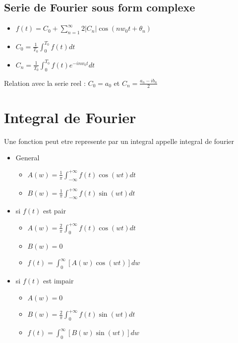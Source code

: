 \documentclass[12pt]{book}
\begin{document}
            \subsection{Serie de Fourier sous form complexe}
                \begin{itemize}
                    \item $f(t) = C_0 + \sum^\infty_{n=1} 2|C_n| \cos(nw_0t + \theta_n)$
                    \item $C_0 = \frac{1}{T_0}\int_0^{T_0}f(t)dt$
                    \item $C_n = \frac{1}{T_0}\int_0^{T_0}f(t)e^{-inw_0t}dt$
                \end{itemize}
                Relation avec la serie reel : $C_0 = a_0$ et $C_n=\frac{a_n-ib_n}{2}$
        \section{Integral de Fourier}
            Une fonction peut etre represente par un integral appelle integral de fourier \\  
            \begin{itemize}
                \item General 
                    \begin{itemize}
                        \item $A(w) = \frac{1}{\pi}\int^{+\infty}_{-\infty}f(t)\cos(wt)dt$
                        \item $B(w) = \frac{1}{\pi}\int^{+\infty}_{-\infty}f(t)\sin(wt)dt$
                    \end{itemize}
                \item si $f(t)$ est pair   
                    \begin{itemize}
                        \item $A(w) = \frac{2}{\pi}\int^{+\infty}_{0}f(t)\cos(wt)dt$
                        \item $B(w) = 0$
                        \item $f(t) = \int^\infty_0 [A(w)\cos(wt) ]dw$
                    \end{itemize}
                \item si $f(t)$ est impair    
                    \begin{itemize}
                        \item $A(w) = 0$
                        \item $B(w) = \frac{2}{\pi}\int^{+\infty}_{0}f(t)\sin(wt)dt$
                        \item $f(t) = \int^\infty_0 [B(w)\sin(wt)]dw$
                    \end{itemize}
            \end{itemize}
\end{document}
